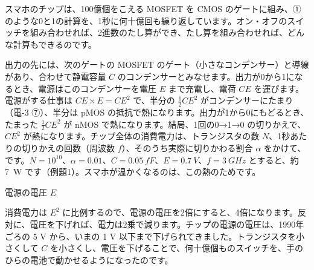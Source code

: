 スマホのチップは、100億個をこえる MOSFET を CMOS のゲートに組み、①のような0と1の計算を、1秒に何十億回も繰り返しています。オン・オフのスイッチを組み合わせれば、2進数のたし算ができ、たし算を組み合わせれば、どんな計算もできるのです。

出力の先には、次のゲートの MOSFET のゲート（小さなコンデンサー）と導線があり、合わせて静電容量 $C$ のコンデンサーとみなせます。出力が0から1になるとき、電源はこのコンデンサーを電圧 $E$ まで充電し、電荷 $CE$ を運びます。電源がする仕事は $CE\times E=CE^2$ で、半分の $\tfrac12CE^2$ がコンデンサーにたまり（電-3 ⑦）、半分は pMOS の抵抗で熱になります。出力が1から0にもどるとき、たまった $\tfrac12CE^2$ が nMOS で熱になります。結局、1回の0→1→0 の切りかえで、$CE^2$ が熱になります。チップ全体の消費電力は、トランジスタの数 $N$、1秒あたりの切りかえの回数（周波数 $f$）、そのうち実際に切りかわる割合 $\alpha$ をかけて、
\label{ph:原-10:power}です。$N=10^{10}$、$\alpha=0.01$、$C=\qty{0.05}{fF}$、$E=\qty{0.7}{V}$、$f=\qty{3}{GHz}$ とすると、約 \qty{7}{W} です（例題1）。スマホが温かくなるのは、この熱のためです。

\begin{phbaisuru}{電源の電圧 $E$}
\noindent\begin{minipage}[c]{0.5\linewidth}\raggedright
消費電力は $E^2$ に比例するので、電源の電圧を2倍にすると、4倍になります。反対に、電圧を下げれば、電力は2乗で減ります。チップの電源の電圧は、1990年ごろの 5 V から、いまの 1 V 以下まで下げられてきました。トランジスタを小さくして $C$ を小さくし、電圧を下げることで、何十億個ものスイッチを、手のひらの電池で動かせるようになったのです。
\end{minipage}\hfill
\begin{minipage}[c]{0.46\linewidth}\centering
{}
\end{minipage}
\end{phbaisuru}


